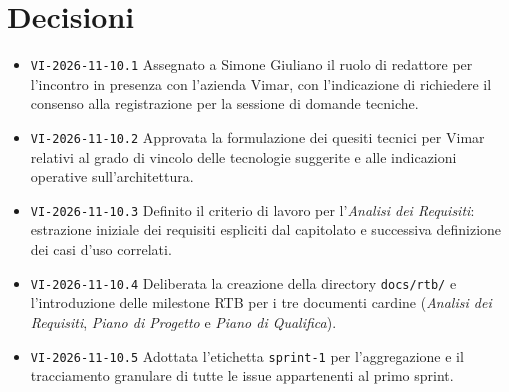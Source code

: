\documentclass[11pt, a4paper]{article}
\begin{document}
\newpage

\section{Decisioni}
\begin{itemize}
    \item \texttt{VI-2026-11-10.1} Assegnato a Simone Giuliano il ruolo di redattore per l'incontro in presenza con l'azienda Vimar, con l'indicazione di richiedere il consenso alla registrazione per la sessione di domande tecniche.
    \item \texttt{VI-2026-11-10.2} Approvata la formulazione dei quesiti tecnici per Vimar relativi al grado di vincolo delle tecnologie suggerite e alle indicazioni operative sull'architettura.
    \item \texttt{VI-2026-11-10.3} Definito il criterio di lavoro per l'\textit{Analisi dei Requisiti}: estrazione iniziale dei requisiti espliciti dal capitolato e successiva definizione dei casi d'uso correlati.
    \item \texttt{VI-2026-11-10.4} Deliberata la creazione della directory \texttt{docs/rtb/} e l'introduzione delle milestone RTB per i tre documenti cardine (\textit{Analisi dei Requisiti}, \textit{Piano di Progetto} e \textit{Piano di Qualifica}).
    \item \texttt{VI-2026-11-10.5} Adottata l'etichetta \texttt{sprint-1} per l'aggregazione e il tracciamento granulare di tutte le issue appartenenti al primo sprint.
\end{itemize}
\end{document}
